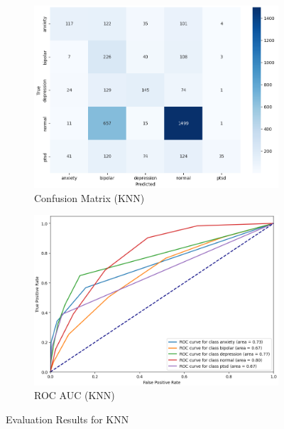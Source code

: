 \vspace{0.25em}

\begin{figure}[h!]
    \centering
    \begin{subfigure}[b]{0.49\textwidth}
        \centering
        \includegraphics[width=\textwidth]{Images/KNN Confusion Matrix.png}
        \caption{Confusion Matrix (KNN)}
        \label{KNNCM}  %
    \end{subfigure}
    \hfill
    \begin{subfigure}[b]{0.49\textwidth}
        \centering
        \includegraphics[width=\textwidth]{Images/KNN ROC.png}
        \caption{ROC AUC (KNN)}
        \label{KNNROC}  %
    \end{subfigure}
    \caption{Evaluation Results for KNN}
    \label{fig:knn_comparison}
\end{figure}

